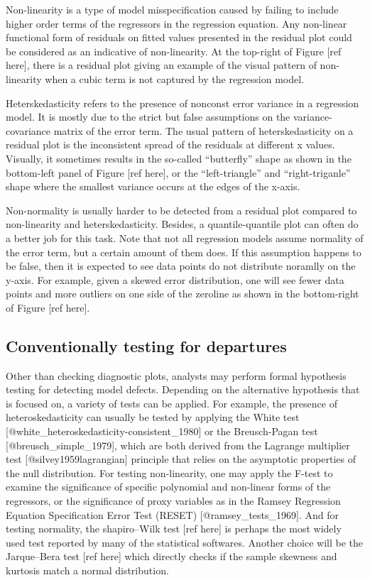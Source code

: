 \documentclass[]{interact}
\theoremstyle{plain}%
\theoremstyle{definition}
\theoremstyle{remark}
\begin{document}
Non-linearity is a type of model misspecification caused by failing to
include higher order terms of the regressors in the regression equation.
Any non-linear functional form of residuals on fitted values presented
in the residual plot could be considered as an indicative of
non-linearity. At the top-right of Figure {[}ref here{]}, there is a
residual plot giving an example of the visual pattern of non-linearity
when a cubic term is not captured by the regression model.

Heterskedasticity refers to the presence of nonconst error variance in a
regression model. It is mostly due to the strict but false assumptions
on the variance-covariance matrix of the error term. The usual pattern
of heterskedasticity on a residual plot is the inconsistent spread of
the residuals at different x values. Visually, it sometimes results in
the so-called ``butterfly'' shape as shown in the bottom-left panel of
Figure {[}ref here{]}, or the ``left-triangle'' and ``right-triganle''
shape where the smallest variance occurs at the edges of the x-axis.

Non-normality is usually harder to be detected from a residual plot
compared to non-linearity and heterskedasticity. Besides, a
quantile-quantile plot can often do a better job for this task. Note
that not all regression models assume normality of the error term, but a
certain amount of them does. If this assumption happens to be false,
then it is expected to see data points do not distribute noramlly on the
y-axis. For example, given a skewed error distribution, one will see
fewer data points and more outliers on one side of the zeroline as shown
in the bottom-right of Figure {[}ref here{]}.

\hypertarget{conventionally-testing-for-departures}{%
\subsection{Conventionally testing for
departures}\label{conventionally-testing-for-departures}}

Other than checking diagnostic plots, analysts may perform formal
hypothesis testing for detecting model defects. Depending on the
alternative hypothesis that is focused on, a variety of tests can be
applied. For example, the presence of heteroskedasticity can usually be
tested by applying the White test
{[}@white\_heteroskedasticity-consistent\_1980{]} or the Breusch-Pagan
test {[}@breusch\_simple\_1979{]}, which are both derived from the
Lagrange multiplier test {[}@silvey1959lagrangian{]} principle that
relies on the asymptotic properties of the null distribution. For
testing non-linearity, one may apply the F-test to examine the
significance of specific polynomial and non-linear forms of the
regressors, or the significance of proxy variables as in the Ramsey
Regression Equation Specification Error Test (RESET)
{[}@ramsey\_tests\_1969{]}. And for testing normality, the shapiro--Wilk
test {[}ref here{]} is perhaps the most widely used test reported by
many of the statistical softwares. Another choice will be the
Jarque--Bera test {[}ref here{]} which directly checks if the sample
skewness and kurtosis match a normal distribution.
\end{document}
